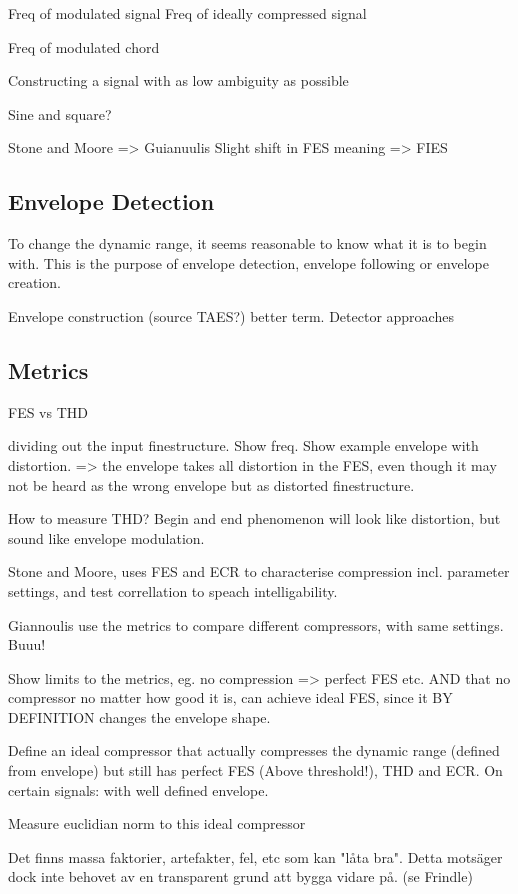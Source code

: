 \documentclass[../main2.tex]{subfiles}
\begin{document}
Freq of modulated signal
Freq of ideally compressed signal

Freq of modulated chord

Constructing a signal with as low ambiguity as possible

Sine and square?

Stone and Moore => Guianuulis
Slight shift in FES meaning => FIES

\subsection{Envelope Detection}
To change the dynamic range, it seems reasonable to know what it is to begin with. This is the purpose of envelope detection, envelope following or envelope creation.

Envelope construction (source TAES?) better term.
Detector approaches

\subsection{Metrics}
FES vs THD

dividing out the input finestructure. Show freq. Show example envelope with distortion. => the envelope takes all distortion in the FES, even though it may not be heard as the wrong envelope but as distorted finestructure.

How to measure THD? Begin and end phenomenon will look like distortion, but sound like envelope modulation.


Stone and Moore, uses FES and ECR to characterise compression incl. parameter settings, and test correllation to speach intelligability.

Giannoulis use the metrics to compare different compressors, with same settings. Buuu!

Show limits to the metrics, eg. no compression => perfect FES etc.
AND that no compressor no matter how good it is, can achieve ideal FES, since it BY DEFINITION changes the envelope shape.

Define an ideal compressor that actually compresses the dynamic range (defined from envelope) but still has perfect FES (Above threshold!), THD and ECR.
On certain signals: with well defined envelope. 

Measure euclidian norm to this ideal compressor




Det finns massa faktorier, artefakter, fel, etc som kan "låta bra". Detta motsäger dock inte behovet av en transparent grund att bygga vidare på. (se Frindle)
\end{document}
